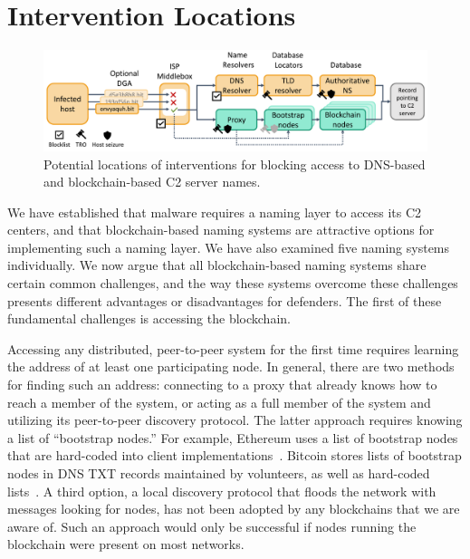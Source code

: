 \section{Intervention Locations}
\label{sec:accessing_records}

\begin{figure}[t]
	\centering
	\includegraphics[width=\textwidth]{figs/intervention_locations.pdf}
	\caption{Potential locations of interventions for 
	blocking access to DNS-based and blockchain-based C2 
	server names.}
	\label{fig:malware_contacting_cnc}
\end{figure}

We have established that malware requires a naming layer to access its C2 
centers, and 
that blockchain-based naming systems are attractive options for implementing 
such a naming layer. We have also examined five naming 
systems individually. 
We now argue that all blockchain-based naming systems share 
certain common 
challenges, and the way these systems overcome these challenges presents 
different advantages or disadvantages for defenders. The first 
of these fundamental challenges is accessing the blockchain.

Accessing any distributed, peer-to-peer system for the first time requires 
learning the address of at least one participating node. In general, there 
are two methods for finding such an address: connecting to a 
proxy that already knows how to reach a member of the system, or acting 
as a full member of the system and utilizing its peer-to-peer discovery 
protocol. The latter approach requires knowing a list of ``bootstrap nodes.'' 
For example, Ethereum uses a list of bootstrap nodes that are hard-coded into 
client implementations~\cite{geth_bootstrap}. Bitcoin 
stores lists of bootstrap nodes in DNS TXT records maintained by volunteers, as 
well as hard-coded 
lists~\cite{bitcoin_bootstrap}. A third option, a 
local discovery protocol that floods the network with 
messages looking for nodes, has not been adopted by any 
blockchains that we are aware of. Such an approach would only be successful if 
nodes running the blockchain were present on most networks. 
 
